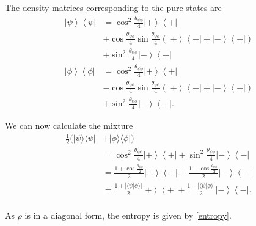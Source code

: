 \documentclass[10pt,twocolumn, nofootinbib]{revtex4-2}
\begin{document}
The density matrices corresponding to the pure states are
\begin{align*}
	\left|\psi\right>\left<\psi\right|&=\cos^2\frac{\theta_{\psi\phi}}{4}\left|+\right>\left<+\right|\\
	&+\cos\frac{\theta_{\psi\phi}}{4}\sin\frac{\theta_{\psi\phi}}{4}\left(\left|+\right>\left<-\right|+\left|-\right>\left<+\right|\right) \\
	&+\sin^2\frac{\theta_{\psi\phi}}{4}\left|-\right>\left<-\right| \\
	\left|\phi\right>\left<\phi\right|&=\cos^2\frac{\theta_{\psi\phi}}{4}\left|+\right>\left<+\right|\\
	&-\cos\frac{\theta_{\psi\phi}}{4}\sin\frac{\theta_{\psi\phi}}{4}\left(\left|+\right>\left<-\right|+\left|-\right>\left<+\right|\right) \\
	&+\sin^2\frac{\theta_{\psi\phi}}{4}\left|-\right>\left<-\right|.
\end{align*}

We can now calculate the mixture
\begin{align*}
	\frac{1}{2}(|\psi\rangle\langle\psi| &+ |\phi\rangle\langle\phi|) \\
	&=\cos^2\frac{\theta_{\psi\phi}}{4}\left|+\right>\left<+\right| +\sin^2\frac{\theta_{\psi\phi}}{4}\left|-\right>\left<-\right| \\
	&=\frac{1+\cos\frac{\theta_{\psi\phi}}{2}}{2}\left|+\right>\left<+\right| +\frac{1-\cos\frac{\theta_{\psi\phi}}{2}}{2}\left|-\right>\left<-\right| \\
	&=\frac{1+|\langle\psi|\phi\rangle|}{2}\left|+\right>\left<+\right| +\frac{1-|\langle\psi|\phi\rangle|}{2}\left|-\right>\left<-\right|. \\
\end{align*}

As $\rho$ is in a diagonal form, the entropy is given by \ref{entropy}.
\end{document}
